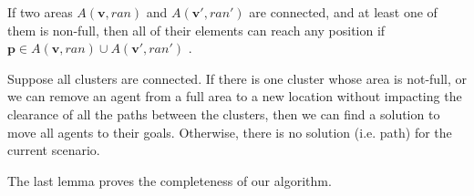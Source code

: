 \begin{lemma}
If two areas $A(\mathbf v, ran)$ and $A(\mathbf v', ran')$ are connected, and at least one of them is non-full, then all of their elements can reach any position if $ \mathbf{p} \in A(\mathbf v, ran) \cup A(\mathbf v', ran')$ .
\label{lem:intertcluster}
\end{lemma}


\begin{lemma}
Suppose all clusters are connected. If there is one cluster whose area is not-full, or we can remove an agent from a full area to a new location without impacting the clearance of all the paths between the clusters, then we can find a solution to move all agents to their goals. Otherwise, there is no solution (i.e. path) for the current scenario.
\label{lem:complete}
\end{lemma}
The last lemma proves the completeness of our algorithm.